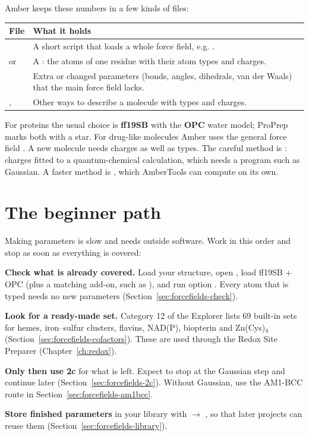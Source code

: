 Amber keeps these numbers in a few kinds of files:

\begin{tabularx}{\linewidth}{@{}lL@{}}
\toprule
\textbf{File} & \textbf{What it holds} \\
\midrule
{} & A short script that loads a whole force field, e.g.
  . \\
 or  & A : the atoms of one
  residue with their atom types and charges. \\
 & Extra or changed parameters (bonds, angles, dihedrals,
  van der Waals) that the main force field lacks. \\
,  & Other ways to describe a molecule with types and
  charges. \\
\bottomrule
\end{tabularx}

\medskip
For proteins the usual choice is \textbf{ff19SB} with the \textbf{OPC} water
model; ProPrep marks both with a star. For drug-like molecules Amber uses the
general force field . A new molecule needs charges as well as
types. The careful method is : charges fitted to a quantum-chemical
calculation, which needs a program such as Gaussian. A faster method is
, which AmberTools can compute on its own.

\section{The beginner path}
\label{sec:forcefields-path}

Making parameters is slow and needs outside software. Work in this order and
stop as soon as everything is covered:

\begin{steps}
  \item \textbf{Check what is already covered.} Load your structure, open
        , load ff19SB + OPC (plus a matching add-on, such as
        ), and run option 
        . Every atom that is typed needs no new
        parameters (Section~\ref{sec:forcefields-check}).
  \item \textbf{Look for a ready-made set.} Category 12 of the Explorer lists
        69 built-in sets for hemes, iron--sulfur clusters, flavins, NAD(P),
        biopterin and Zn(Cys)$_4$ (Section~\ref{sec:forcefields-cofactors}).
        These are used through the Redox Site Preparer
        (Chapter~\ref{ch:redox}).
  \item \textbf{Only then use 2c} for what is left. Expect to stop at the
        Gaussian step and continue later (Section~\ref{sec:forcefields-2c}).
        Without Gaussian, use the AM1-BCC route in
        Section~\ref{sec:forcefields-am1bcc}.
  \item \textbf{Store finished parameters} in your library with 
        $\to$ , so that later projects can reuse them
        (Section~\ref{sec:forcefields-library}).
\end{steps}

